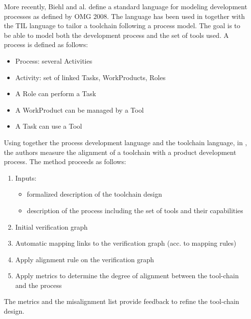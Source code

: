 More recently, Biehl and al.  define a standard language for modeling
development processes as defined by OMG 2008. The language has been used in \cite{biehl_constructing_2012,biehl_early_2012} together with the TIL
language to tailor a toolchain following a process model. The goal is
to be able to model both the development process and the set of tools
used.  A process is defined as follows:
\begin{itemize}
\item Process: several Activities
\item Activity: set of linked Tasks, WorkProducts, Roles
\item A Role can perform a Task
\item A WorkProduct can be managed by a Tool
\item A Task can use a Tool
\end{itemize}
Using together the process development language  and the toolchain
language, in \cite{biehl_early_2012}, the authors  measure the alignment of a toolchain
with a product development process. The method proceeds as follows:
\begin{enumerate}
\item Inputs:
  \begin{itemize}
  \item formalized description of the toolchain design
  \item description of the process including the set of tools and their capabilities
  \end{itemize}
\item Initial verification graph
\item Automatic mapping links to the verification graph (acc. to mapping rules)
\item Apply alignment rule on the verification graph
\item Apply metrics to determine the degree of alignment between the tool-chain and the
   process
\end{enumerate}
The metrics and the misalignment list provide feedback to refine the tool-chain
design.



